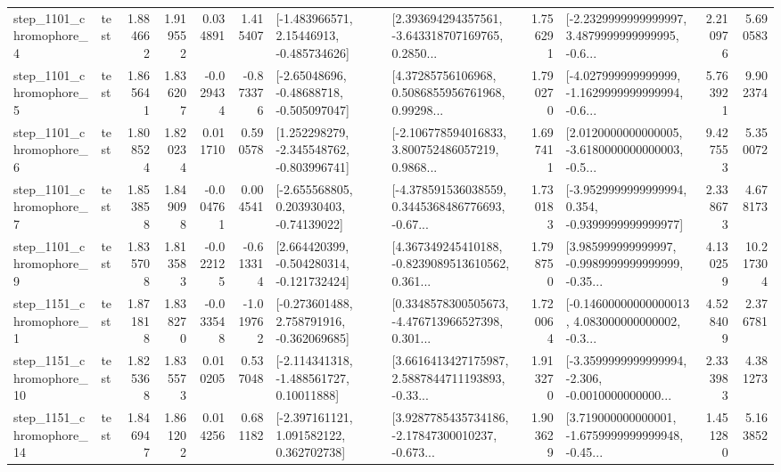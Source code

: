 \begin{tabular}{llrrrrllrlrr}
  step\_1101\_chromophore\_4 &      test &      1.884662 &    1.919552 &      0.034891 &  1.415407 &    [-1.483966571, 2.15446913, -0.485734626] &  [2.393694294357561, -3.643318707169765, 0.2850... &       1.756291 &  [-2.2329999999999997, 3.4879999999999995, -0.6... &            2.210976 &          5.690583 \\
  step\_1101\_chromophore\_5 &      test &      1.865641 &    1.836207 &     -0.029434 & -0.873376 &    [-2.65048696, -0.48688718, -0.505097047] &  [4.37285756106968, 0.5086855956761968, 0.99298... &       1.790270 &  [-4.027999999999999, -1.1629999999999994, -0.6... &            5.763921 &          9.902374 \\
  step\_1101\_chromophore\_6 &      test &      1.808524 &    1.820234 &      0.011710 &  0.590578 &   [1.252298279, -2.345548762, -0.803996741] &  [-2.106778594016833, 3.800752486057219, 0.9868... &       1.697411 &  [2.0120000000000005, -3.6180000000000003, -0.5... &            9.427553 &          5.350072 \\
  step\_1101\_chromophore\_7 &      test &      1.853858 &    1.849098 &     -0.004761 &  0.004541 &    [-2.655568805, 0.203930403, -0.74139022] &  [-4.378591536038559, 0.3445368486776693, -0.67... &       1.730183 &  [-3.9529999999999994, 0.354, -0.9399999999999977] &            2.338673 &          4.678173 \\
  step\_1101\_chromophore\_9 &      test &      1.835708 &    1.813583 &     -0.022125 & -0.613314 &   [2.664420399, -0.504280314, -0.121732424] &  [4.367349245410188, -0.8239089513610562, 0.361... &       1.798750 &  [3.985999999999997, -0.9989999999999999, -0.35... &            4.130259 &         10.217304 \\
  step\_1151\_chromophore\_1 &      test &      1.871818 &    1.838270 &     -0.033548 & -1.019762 &   [-0.273601488, 2.758791916, -0.362069685] &  [0.3348578300505673, -4.476713966527398, 0.301... &       1.720064 &  [-0.14600000000000013, 4.083000000000002, -0.3... &            4.528409 &          2.376781 \\
 step\_1151\_chromophore\_10 &      test &      1.825368 &    1.835573 &      0.010205 &  0.537048 &    [-2.114341318, -1.488561727, 0.10011888] &  [3.6616413427175987, 2.5887844711193893, -0.33... &       1.913270 &  [-3.3599999999999994, -2.306, -0.0010000000000... &            2.333983 &          4.381273 \\
 step\_1151\_chromophore\_14 &      test &      1.846947 &    1.861202 &      0.014256 &  0.681182 &    [-2.397161121, 1.091582122, 0.362702738] &  [3.9287785435734186, -2.17847300010237, -0.673... &       1.903629 &  [3.719000000000001, -1.6759999999999948, -0.45... &            1.451280 &          5.163852 \\

\end{tabular}
